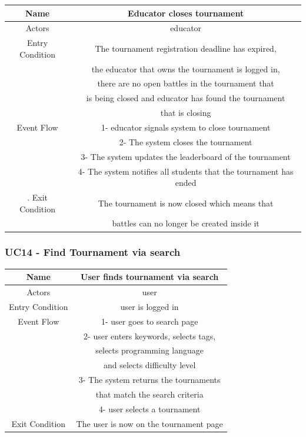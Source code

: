 \documentclass{article}
\begin{document}
\begin{tabular*}{\linewidth}{@{\extracolsep{\fill}} cc }
    \hline
    Name & Educator closes tournament\\ 
    \hline
    Actors & educator\\ 
    \hline
    Entry Condition & The tournament registration deadline has expired,\\
                    & the educator that owns the tournament is logged in,\\
                    & there are no open battles in the tournament that\\
                    & is being closed and educator has found the tournament\\
                    & that is closing\\
    \hline
    Event Flow & 1- educator signals system to close tournament\\
               & 2- The system closes the tournament\\
               & 3- The system updates the leaderboard of the tournament\\
               & 4- The system notifies all students that the tournament has ended\\
    \hline.
    Exit Condition  & The tournament is now closed which means that\\
                    & battles can no longer be created inside it\\
                
    \hline
\end{tabular*}

\subsubsection*{UC14 - Find Tournament via search}

\begin{tabular*}{\linewidth}{@{\extracolsep{\fill}} cc }
    \hline
    Name & User finds tournament via search\\ 
    \hline
    Actors & user\\ 
    \hline
    Entry Condition & user is logged in\\
    \hline
    Event Flow & 1- user goes to search page\\
               & 2- user enters keywords, selects tags, \\
               & selects programming language\\
               & and selects difficulty level\\
               & 3- The system returns the tournaments \\
               & that match the search criteria\\
               & 4- user selects a tournament\\
    \hline
    Exit Condition & The user is now on the tournament page\\ 
    \hline
\end{tabular*}
\end{document}

